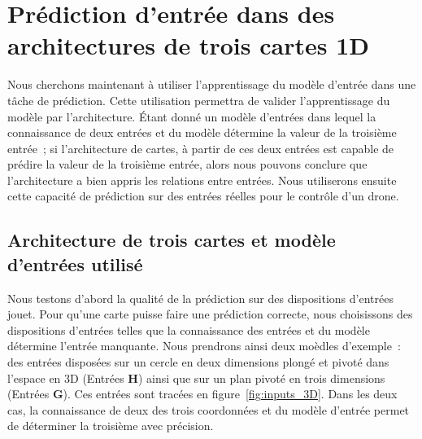 \documentclass[../main]{subfiles}
\begin{document}
\section{Prédiction d'entrée dans des architectures de trois cartes 1D}


Nous cherchons maintenant à utiliser l'apprentissage du modèle d'entrée dans une tâche de prédiction. Cette utilisation permettra de valider l'apprentissage du modèle par l'architecture. \'Etant donné un modèle d'entrées dans lequel la connaissance de deux entrées et du modèle détermine la valeur de la troisième entrée~; si l'architecture de cartes, à partir de ces deux entrées est capable de prédire la valeur de la troisième entrée, alors nous pouvons conclure que l'architecture a bien appris les relations entre entrées. 
Nous utiliserons ensuite cette capacité de prédiction sur des entrées réelles pour le contrôle d'un drone.

\subsection{Architecture de trois cartes et modèle d'entrées utilisé}

Nous testons d'abord la qualité de la prédiction sur des dispositions d'entrées jouet.
Pour qu'une carte puisse faire une prédiction correcte, nous choisissons des dispositions d'entrées telles que la connaissance des entrées et du modèle détermine l'entrée manquante.
Nous prendrons ainsi deux moèdles d'exemple~: des entrées disposées sur un cercle en deux dimensions plongé et pivoté dans l'espace en 3D (Entrées \textbf{H}) ainsi que sur un plan pivoté en trois dimensions (Entrées \textbf{G}). Ces entrées sont tracées en figure~\ref{fig:inputs_3D}. Dans les deux cas, la connaissance de deux des trois coordonnées et du modèle d'entrée permet de déterminer la troisième avec précision.
\end{document}
